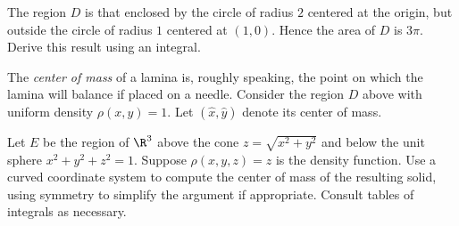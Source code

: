 \documentclass[12pt]{exam}
\theoremstyle{definition}
\begin{document}
\begin{questions}

\question The region $D$ is that enclosed by the circle of radius $2$
centered at the origin, but outside the circle of radius $1$ centered at
$(1,0)$. Hence the area of $D$ is $3\pi$. Derive this result using an
integral.


\question The \emph{center of mass} of a lamina is, roughly speaking,
the point on which the lamina will balance if placed on a needle.
Consider the region $D$ above with uniform density $\rho(x,y) = 1$. Let
$(\hat{x}, \hat{y})$ denote its center of mass.


\newpage

\question Let $E$ be the region of $\R^3$ above the cone
$z = \sqrt{x^2 + y^2}$ and below the unit sphere $x^2 + y^2 + z^2 = 1$.
Suppose $\rho(x,y,z) = z$ is the density function. Use a curved
coordinate system to compute the center of mass of the resulting solid,
using symmetry to simplify the argument if appropriate. Consult tables
of integrals as necessary.



\end{questions}
\end{document}
